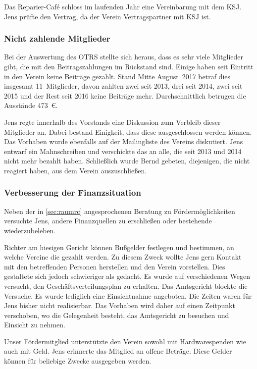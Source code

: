 \documentclass[ngerman]{scrartcl}
\begin{document}
Das Reparier-Café schloss im laufenden Jahr eine Vereinbarung mit dem KSJ. Jens
prüfte den Vertrag, da der Verein Vertragspartner mit KSJ ist. 

\subsubsection{Nicht zahlende Mitglieder}

Bei der Auswertung des OTRS stellte sich heraus, dass es sehr viele Mitglieder
gibt, die mit den Beitragszahlungen im Rückstand sind. Einige haben seit
Eintritt in den Verein keine Beiträge gezahlt. Stand Mitte August~2017 betraf
dies insgesamt 11~Mitglieder, davon zahlten zwei seit 2013, drei seit 2014, zwei
seit 2015 und der Rest seit 2016 keine Beiträge mehr. Durchschnittlich betrugen
die Ausstände \num{473}~\euro{}.

Jens regte innerhalb des
Vorstands eine Diskussion zum Verbleib dieser Mitglieder an. Dabei bestand
Einigkeit, dass diese ausgeschlossen werden können. Das Vorhaben wurde ebenfalls
auf der Mailingliste des Vereins diskutiert. Jens entwarf ein Mahnschreiben und
verschickte das an alle, die seit 2013 und 2014 nicht mehr bezahlt
haben. Schließlich wurde Bernd gebeten, diejenigen, die nicht reagiert haben,
aus dem Verein auszuschließen.

\subsubsection{Verbesserung der Finanzsituation}

Neben der in \autoref{sec:raumrc} angesprochenen Beratung zu Fördermöglichkeiten
versuchte Jens, andere Finanzquellen zu erschließen oder bestehende
wiederzubeleben.

Richter am hiesigen Gericht können Bußgelder festlegen und bestimmen, an welche
Vereine die gezahlt werden. Zu diesem Zweck wollte Jens gern Kontakt mit den
betreffenden Personen herstellen und den Verein vorstellen. Dies gestaltete sich
jedoch schwieriger als gedacht. Es wurde auf verschiedenen Wegen versucht, den
Geschäftsverteilungsplan zu erhalten. Das Amtsgericht blockte die Versuche. Es
wurde lediglich eine Einsichtnahme angeboten. Die Zeiten waren für Jens bisher
nicht realisierbar. Das Vorhaben wird daher auf einen Zeitpunkt verschoben, wo
die Gelegenheit besteht, das Amtsgericht zu besuchen und Einsicht zu nehmen.

Unser Fördermitglied unterstützte den Verein sowohl mit Hardwarespenden wie auch
mit Geld. Jens erinnerte das Mitglied an offene Beträge. Diese Gelder können für
beliebige Zwecke ausgegeben werden.
\end{document}
